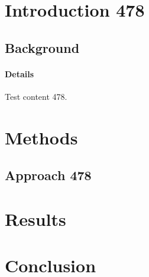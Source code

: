 \documentclass{article}
\begin{document}
\section{Introduction 478}
\subsection{Background}
\paragraph{Details} Test content 478.
\section{Methods}
\subsection{Approach 478}
\section{Results}
\section{Conclusion}
\end{document}
